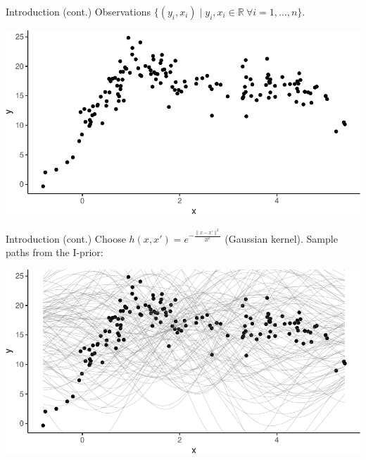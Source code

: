 \documentclass[,aspectratio=43]{beamer}
\newcommand{\bbR}{\mathbb{R}}
\begin{document}
\begin{frame}{Introduction (cont.)}
\protect\hypertarget{introduction-cont.}{}
Observations
\(\{(y_i,x_i) \mid y_i,x_i\in\bbR \ \forall i=1,\dots,n\}\).

\vspace{1em }

\includegraphics{figure/datapoints-1.pdf}
\end{frame}

\begin{frame}{Introduction (cont.)}
\protect\hypertarget{introduction-cont.-1}{}
Choose \(h(x,x') = e^{-\frac{\lVert x - x' \rVert^2}{2l^2}}\) (Gaussian
kernel). Sample paths from the I-prior:

\vspace{1em}

\includegraphics{figure/priorsamp-1.pdf}
\end{frame}
\end{document}
